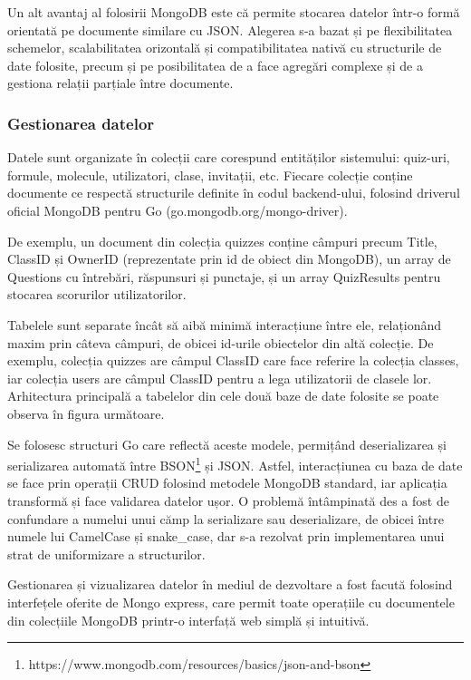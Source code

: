 Un alt avantaj al folosirii MongoDB este că permite stocarea datelor într-o formă 
orientată pe documente similare cu JSON. Alegerea s-a bazat și pe flexibilitatea schemelor,
scalabilitatea orizontală și compatibilitatea nativă cu structurile de date folosite, precum și
pe posibilitatea de a face agregări complexe și de a gestiona relații parțiale între documente. 

\subsubsection{Gestionarea datelor}

Datele sunt organizate în colecții care corespund entităților sistemului:
quiz-uri, formule, molecule, utilizatori, clase, invitații, etc. Fiecare colecție conține documente ce
respectă structurile definite în codul backend-ului, folosind driverul oficial MongoDB pentru
Go (go.mongodb.org/mongo-driver).

De exemplu, un document din colecția quizzes conține câmpuri precum Title,
ClassID și OwnerID (reprezentate prin id de obiect din MongoDB), un array de
Questions cu întrebări, răspunsuri și punctaje, și un array QuizResults pentru
stocarea scorurilor utilizatorilor.

Tabelele sunt separate încât să aibă minimă interacțiune între ele, relaționând maxim prin câteva
câmpuri, de obicei id-urile obiectelor din altă colecție. De exemplu, colecția quizzes are
câmpul ClassID care face referire la colecția classes, iar colecția
users are câmpul ClassID pentru a lega utilizatorii de clasele lor. Arhitectura principală a tabelelor din
cele două baze de date folosite se poate observa în figura următoare.


Se folosesc structuri Go care reflectă aceste modele, permițând deserializarea și serializarea 
automată între BSON\footnote{https://www.mongodb.com/resources/basics/json-and-bson} și
JSON. Astfel, interacțiunea 
cu baza de date se face prin operații CRUD folosind
metodele MongoDB standard, iar aplicația transformă și face validarea datelor ușor. O problemă
întâmpinată des a fost de confundare a numelui unui cămp la serializare sau deserializare, 
de obicei între numele lui CamelCase și snake_case, dar s-a rezolvat prin implementarea unui
strat de uniformizare a structurilor.

Gestionarea și vizualizarea datelor în mediul de dezvoltare a fost facută folosind interfețele oferite de Mongo express,
care permit toate operațiile cu documentele din colecțiile MongoDB printr-o interfață web simplă și intuitivă.

